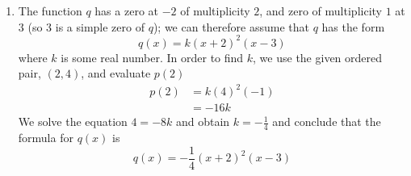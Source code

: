 \begin{pccexample}
\begin{pccsolution}
\begin{enumerate}
				       \begin{align*}
					       p(x) & =(x+3)(x+1)(x-0)(x-2) \\
					            & =x(x+3)(x+1)(x-2)     \\
				       \end{align*}
				       According to \cref{poly:fig:findformulademo}, the point $(1,8)$ lies
				       on the curve $y=p(x)$.
				       Let's check if the formula we have written satisfies this requirement
				       \begin{align*}
					       p(1) & = (1)(4)(2)(-1) \\
					            & = -8
				       \end{align*}
				       which is clearly not correct| it is close though. We can correct this by
				       multiplying $p$ by a constant $k$; so let's assume that
				       \[
					       p(x)=kx(x+3)(x+1)(x-2)
				       \]
				       Then $p(1)=-8k$, and if this is to equal $8$, then $k=-1$. Therefore
				       the formula for $p(x)$ is
				       \[
					       p(x)=-x(x+3)(x+1)(x-2)
				       \]
				 \item The function $q$ has a zero at $-2$ of multiplicity $2$, and zero of
				       multiplicity $1$ at $3$ (so $3$ is a simple zero of $q$); we can therefore assume that $q$ has the form
				       \[
					       q(x)=k(x+2)^2(x-3)
				       \]
				       where $k$ is some real number. In order to find $k$, we use the given ordered pair, $(2,4)$, and
				       evaluate $p(2)$
				       \begin{align*}
					       p(2) & =k(4)^2(-1) \\
					            & =-16k
				       \end{align*}
				       We solve the equation $4=-8k$ and obtain $k=-\frac{1}{4}$ and conclude that the
				       formula for $q(x)$ is
				       \[
					       q(x)=-\frac{1}{4}(x+2)^2(x-3)
				       \]
			 \end{enumerate}
		 \end{pccsolution}
	 \end{pccexample}


